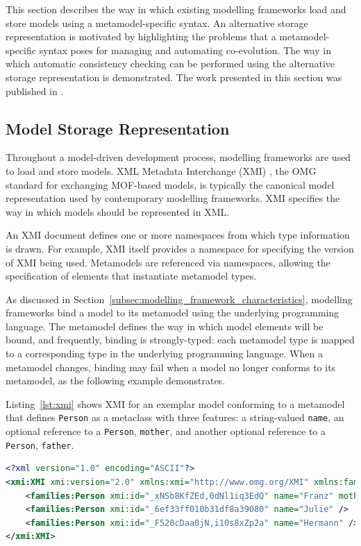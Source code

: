 This section describes the way in which existing modelling frameworks load and store models using a metamodel-specific syntax. An alternative storage representation is motivated by highlighting the problems that a metamodel-specific syntax poses for managing and automating co-evolution. The way in which automatic consistency checking can be performed using the alternative storage representation is demonstrated. The work presented in this section was published in \cite{rose09enhanced}.


\subsection{Model Storage Representation}
Throughout a model-driven development process, modelling frameworks are used to load and store models. XML Metadata Interchange (XMI) \cite{xmi}, the OMG standard for exchanging MOF-based models, is typically the canonical model representation used by contemporary modelling frameworks. XMI specifies the way in which models should be represented in XML.

An XMI document defines one or more namespaces from which type information is drawn. For example, XMI itself provides a namespace for specifying the version of XMI being used. Metamodels are referenced via namespaces, allowing the specification of elements that instantiate metamodel types.

As discussed in Section~\ref{subsec:modelling_framework_characteristics}, modelling frameworks bind a model to its metamodel using the underlying programming language. The metamodel defines the way in which model elements will be bound, and frequently, binding is strongly-typed: each metamodel type is mapped to a corresponding type in the underlying programming language. When a metamodel changes, binding may fail when a model no longer conforms to its metamodel, as the following example demonstrates. 

Listing~\ref{lst:xmi} shows XMI for an exemplar model conforming to a metamodel that defines \texttt{Person} as a metaclass with three features: a string-valued \texttt{name}, an optional reference to a \texttt{Person}, \texttt{mother}, and another optional reference to a \texttt{Person}, \texttt{father}.

\begin{lstlisting}[caption=Exemplar person model in XMI, label=lst:xmi, language=XML]
<?xml version="1.0" encoding="ASCII"?>
<xmi:XMI xmi:version="2.0" xmlns:xmi="http://www.omg.org/XMI" xmlns:families="http://www.cs.york.ac.uk/families">
	<families:Person xmi:id="_xNSb8KfZEd,0dNl1iq3EdQ" name="Franz" mother="_6ef33ff010b31df8a39080" father="_F520cDaa0jN,i10s8xZp2a" />
	<families:Person xmi:id="_6ef33ff010b31df8a39080" name="Julie" />
	<families:Person xmi:id="_F520cDaa0jN,i10s8xZp2a" name="Hermann" />
</xmi:XMI>
\end{lstlisting}

